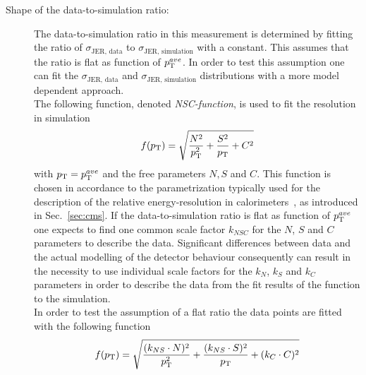 \begin{description}
\item[Shape of the data-to-simulation ratio:] The data-to-simulation ratio in this measurement is determined by fitting the ratio of $\sigma_\mathrm{JER,\, data}$ to $\sigma_\mathrm{JER,\, simulation}$ with a constant. This assumes that the ratio is flat as function of $p_{\text{T}}^{ave}$. In order to test this assumption one can fit the $\sigma_\mathrm{JER,\, data}$ and $\sigma_\mathrm{JER,\, simulation}$ distributions with a more model dependent approach. \\ 
The following function, denoted \textit{NSC-function}, is used to fit the resolution in simulation
\begin{equation}
f(p_{\text{T}}) = \sqrt{\frac{N^2}{p_{\text{T}}^{2}} + \frac{S^2}{p_{\text{T}}} + C^2}
\label{eq:NSC}
\end{equation}
with $p_{\text{T}}=p_{\text{T}}^{ave}$ and the free parameters $N, S$ and $C$. This function is chosen in accordance to the parametrization typically used for the description of the relative energy-resolution in calorimeters~\cite{bib:PDG:2012}, as introduced in Sec.~\ref{sec:cms}. If the data-to-simulation ratio is flat as function of $p_{\text{T}}^{ave}$ one expects to find one common scale factor $k_{NSC}$ for the $N$, $S$ and $C$ parameters to describe the data. Significant differences between data and the actual modelling of the detector behaviour consequently can result in the necessity to use individual scale factors for the $k_N$, $k_S$ and $k_C$ parameters in order to describe the data from the fit results of the function to the simulation. \\
In order to test the assumption of a flat ratio the data points are fitted with the following function 
\begin{equation}
f(p_{\text{T}}) = \sqrt{\frac{(k_{NS} \cdot N)^2}{p_{\text{T}}^{2}} + \frac{(k_{NS} \cdot S)^2}{p_{\text{T}}} + (k_{C} \cdot C)^2} 
\end{equation} 

\end{description}
